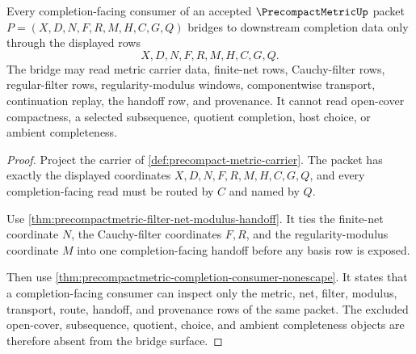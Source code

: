 \begin{theorem}
\label{thm:precompactmetric-bridged-completion-handoff}
Every completion-facing consumer of an accepted $\PrecompactMetricUp$ packet
$P=(X,D,N,F,R,M,H,C,G,Q)$ bridges to downstream completion data only through
the displayed rows
$$
X,D,N,F,R,M,H,C,G,Q .
$$
The bridge may read metric carrier data, finite-net rows, Cauchy-filter rows,
regular-filter rows, regularity-modulus windows, componentwise transport,
continuation replay, the handoff row, and provenance. It cannot read
open-cover compactness, a selected subsequence, quotient completion, host
choice, or ambient completeness.
\end{theorem}
\begin{proof}
Project the carrier of \autoref{def:precompact-metric-carrier}. The packet
has exactly the displayed coordinates $X,D,N,F,R,M,H,C,G,Q$, and every
completion-facing read must be routed by $C$ and named by $Q$.

Use \autoref{thm:precompactmetric-filter-net-modulus-handoff}. It ties the
finite-net coordinate $N$, the Cauchy-filter coordinates $F,R$, and the
regularity-modulus coordinate $M$ into one completion-facing handoff before
any basis row is exposed.

Then use \autoref{thm:precompactmetric-completion-consumer-nonescape}. It
states that a completion-facing consumer can inspect only the metric, net,
filter, modulus, transport, route, handoff, and provenance rows of the same
packet. The excluded open-cover, subsequence, quotient, choice, and ambient
completeness objects are therefore absent from the bridge surface.
\end{proof}

